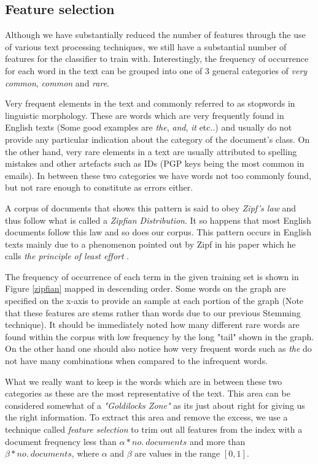 \subsection{Feature selection}
Although we have substantially reduced the number of features through the use of various text processing techniques, we still have a substantial number of features for the classifier to train with. Interestingly, the frequency of occurrence for each word in the text can be grouped into one of 3 general categories of \textit{very common}, \textit{common} and \textit{rare}. 

Very frequent elements in the text and commonly referred to as stopwords in linguistic morphology. These are words which are very frequently found in English texts (Some good examples are \emph{the}, \emph{and}, \emph{it} etc..) and usually do not provide any particular indication about the category of the document's class. On the other hand, very rare elements in a text are usually attributed to spelling mistakes and other artefacts such as IDs (PGP keys being the most common in emails). In between these two categories we have words not too commonly found, but not rare enough to constitute as errors either.

A corpus of documents that shows this pattern is said to obey \emph{Zipf's law} and thus follow what is called a \emph{Zipfian Distribution}. It so happens that most English documents follow this law and so does our corpus. This pattern occurs in English texts mainly due to a phenomenon pointed out by Zipf in his paper which he calls  \emph{the principle of least effort} \cite{zipf1949}.

The frequency of occurrence of each term in the given training set is shown in Figure \ref{zipfian} mapped in descending order. Some words on the graph are specified on the x-axis to provide an sample at each portion of the graph (Note that these features are stems rather than words due to our previous Stemming technique). It should be immediately noted how many different rare words are found within the corpus with low frequency by the long "tail" shown in the graph. On the other hand one should also notice how very frequent words such as \emph{the} do not have many combinations when compared to the infrequent words.

What we really want to keep is the words which are in between these two categories as these are the most representative of the text. This area can be considered somewhat of a \emph{"Goldilocks Zone"} as its just about right for giving us the right information. To extract this area and remove the excess, we use a technique called \textit{feature selection} to trim out all features from the index with a document frequency less than \(\alpha * no.\:documents\) and more than \(\beta * no.\:documents\), where \(\alpha\) and \(\beta\) are values in the range $[0,1]$.

